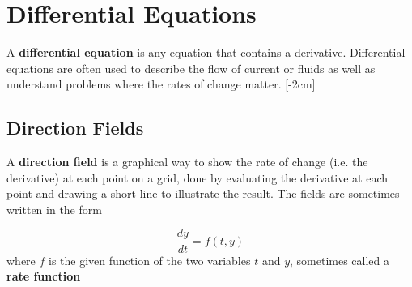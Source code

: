 \chapter{Differential Equations}
A \textbf{differential equation} is any equation that contains a derivative. Differential equations are often used to describe the flow of current or fluids as well as understand problems where the rates of change matter. [-2cm] \normalsize

\section{Direction Fields}
A \textbf{direction field} is a graphical way to show the rate of change (i.e. the derivative) at each point on a grid, done by evaluating the derivative at each point and drawing a short line to illustrate the result. 
The fields are sometimes written in the form
\begin{eqlisting}[H] \label{dirfieldeq}
	\begin{equation}
		\frac{dy}{dt} = f(t, y)
	\end{equation}
	\tiny where $f$ is the given function of the two variables $t$ and $y$, sometimes called a \textbf{rate function}
\end{eqlisting}
 \normalsize
